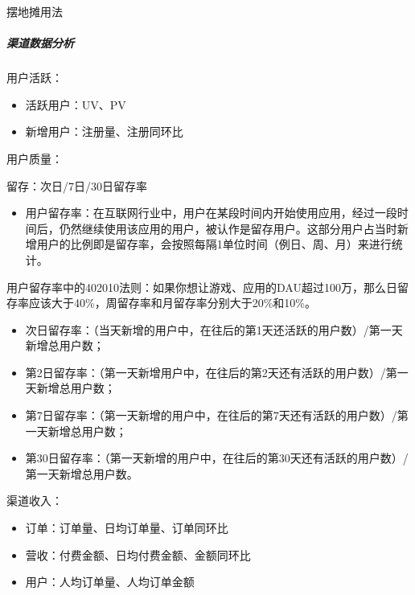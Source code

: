 \documentclass[letterpaper,10pt,english]{sphinxmanual}
\begin{document}
\begin{center}\end{center}
摆地摊用法%
\begin{footnote}[668]\sphinxAtStartFootnote
{}
%
\end{footnote}


\subparagraph{渠道数据分析}
\label{\detokenize{chapter_knowledge/data_analysis:id11}}
用户活跃：
\begin{itemize}
\item {} 
活跃用户：UV、PV

\item {} 
新增用户：注册量、注册同环比

\end{itemize}

用户质量：

留存：次日/7日/30日留存率
\begin{itemize}
\item {} 
用户留存率：在互联网行业中，用户在某段时间内开始使用应用，经过一段时间后，仍然继续使用该应用的用户，被认作是留存用户。这部分用户占当时新增用户的比例即是留存率，会按照每隔1单位时间（例日、周、月）来进行统计。

\end{itemize}

用户留存率中的40\sphinxhyphen{}20\sphinxhyphen{}10法则：如果你想让游戏、应用的DAU超过100万，那么日留存率应该大于40\%，周留存率和月留存率分别大于20\%和10\%。
\begin{itemize}
\item {} 
次日留存率：（当天新增的用户中，在往后的第1天还活跃的用户数）/第一天新增总用户数；

\item {} 
第2日留存率：（第一天新增用户中，在往后的第2天还有活跃的用户数）/第一天新增总用户数；

\item {} 
第7日留存率：（第一天新增的用户中，在往后的第7天还有活跃的用户数）/第一天新增总用户数；

\item {} 
第30日留存率：（第一天新增的用户中，在往后的第30天还有活跃的用户数）/第一天新增总用户数。

\end{itemize}

渠道收入：
\begin{itemize}
\item {} 
订单：订单量、日均订单量、订单同环比

\item {} 
营收：付费金额、日均付费金额、金额同环比

\item {} 
用户：人均订单量、人均订单金额

\end{itemize}
\end{document}
